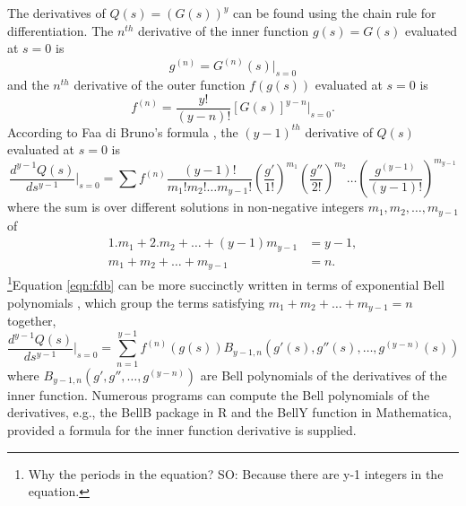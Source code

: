 \documentclass{imammb}
\numberwithin{equation}{section}
\begin{document}
The derivatives of $Q(s) = (G(s))^y$ can be found using the chain rule for differentiation. The $n^{th}$ derivative of the inner function $g(s) = G(s)$ evaluated at $s=0$ is
\begin{equation}\label{eqn:g}
    g^{(n)}=  G^{(n)}(s)  \Bigr|_{s=0}
\end{equation}
and the $n^{th}$ derivative of the outer function $f(g(s))$ evaluated at $s=0$ is
\begin{equation}\label{eqn:f}
    f^{(n)}= \frac{y!}{(y-n)!} [G(s)]^{y-n}  \Bigr|_{s=0}.
\end{equation}
According to Faa di Bruno's formula \citep{Johnson2002-nq}, the $(y-1)^{th}$ derivative of $Q(s)$ evaluated at $s=0$ is
\begin{equation}\label{eqn:fdb}
    \frac{d^{y-1} Q(s)}{ds^{y-1}} \Bigr|_{s=0} = \sum  f^{(n)} \frac{(y-1)!}{m_1! m_2! \dots m_{y-1}!} \left ( \frac{g'}{1!}\right )^{m_1} \left ( \frac{g''}{2!} \right )^{m_2}\dots \left ( \frac{g^{(y-1)}}{(y-1)!} \right )^{m_{y-1}}
\end{equation}
where the sum is over different solutions in non-negative integers $m_1, m_2, \dots, m_{y-1}$ of
\begin{align*}
    1. m_1 + 2. m_2 + \dots + (y-1) m_{y-1} &= y-1,\\
     m_1 + m_2 + \dots + m_{y-1} &= n.
\end{align*}
\footnote{Why the periods in the equation? SO: Because there are y-1 integers in the equation. }Equation \eqref{eqn:fdb} can be more succinctly written in terms of exponential Bell polynomials \citep{Johnson2002-nq, Cvijovic2011-ml}, which group the terms satisfying $m_1 + m_2 + \dots + m_{y-1} = n$ together,
\begin{equation}\label{eqn:fdbbell}
    \frac{d^{y-1} Q(s)}{ds^{y-1}} \Bigr|_{s=0} = \sum_{n=1}^{y-1}  f^{(n)}(g(s)) B_{y-1,n}(g'(s), g''(s), \dots, g^{(y-n)}(s))
\end{equation}
where $B_{y-1,n}(g', g'', \dots, g^{(y-n)})$ are Bell polynomials of the derivatives of the inner function. Numerous programs can compute the Bell polynomials of the derivatives, e.g., the BellB package in R \citep{Rajala2019-hs} and the BellY function in Mathematica, provided a formula for the inner function derivative is supplied. 
\end{document}
